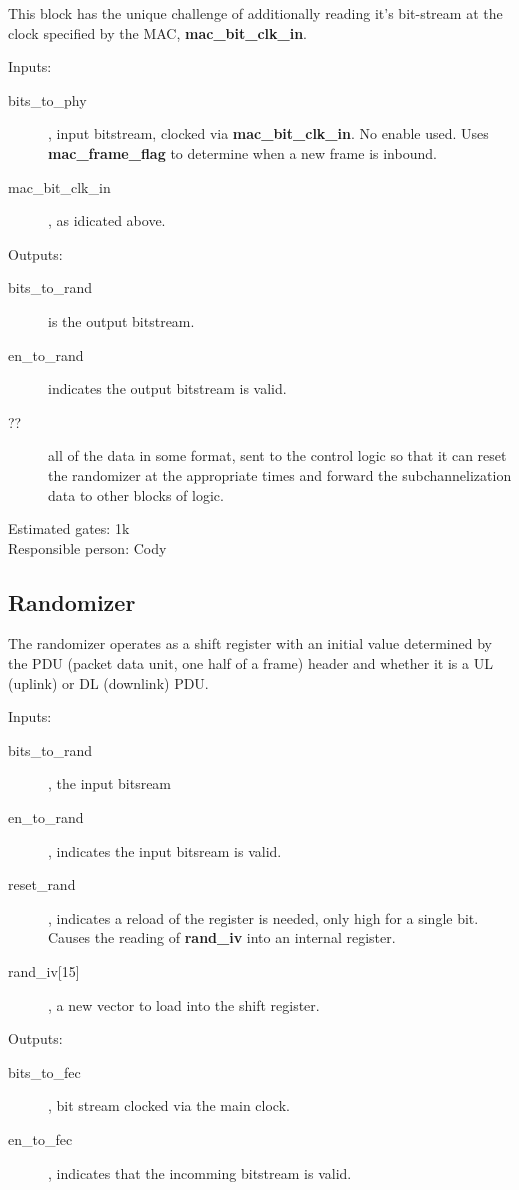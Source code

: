 \documentclass[dvips,10pt,twocolumn]{article}
\begin{document}
	This block has the unique challenge of additionally reading it's
	bit-stream at the clock specified by the MAC,
	\textbf{mac\_bit\_clk\_in}.

	\begin{description}
		\item{Inputs:} \begin{description}
			\item[bits\_to\_phy], input bitstream,  clocked via
				\textbf{mac\_bit\_clk\_in}.  No enable
				used. Uses \textbf{mac\_frame\_flag} to
				determine when a new frame is inbound.
			\item[mac\_bit\_clk\_in], as idicated above.
		\end{description}
		\item{Outputs:} \begin{description}
			\item[bits\_to\_rand] is the output bitstream.
			\item[en\_to\_rand] indicates the output bitstream
				is valid.
			\item[??] all of the data in some format, sent to
				the control logic so that it can reset the
				randomizer at the appropriate times and
				forward the subchannelization data to other
				blocks of logic.
		\end{description}
	\end{description}

	Estimated gates: 1k \\
	Responsible person: Cody

	\subsection{Randomizer}
	\label{sec:rand}
	The randomizer operates as a shift register with an initial value
	determined by the PDU (packet data unit, one half of a frame) header
	and whether it is a UL (uplink) or DL (downlink) PDU.

	\begin{description}
		\item{Inputs:}
		\begin{description}
			\item[bits\_to\_rand], the input bitsream
			\item[en\_to\_rand], indicates the input bitsream
				is valid.
			\item[reset\_rand], indicates a reload of the
				register is needed, only high for a single
				bit. Causes the reading of \textbf{rand\_iv}
				into an internal register.
			\item[rand\_iv{[15]}], a new vector to load into
				the shift register.
		\end{description}
		\item{Outputs:}
		\begin{description}
			\item[bits\_to\_fec], bit stream clocked via the
				main clock.
			\item[en\_to\_fec], indicates that the incomming
				bitstream is valid.
		\end{description}
	\end{description}
\end{document}
